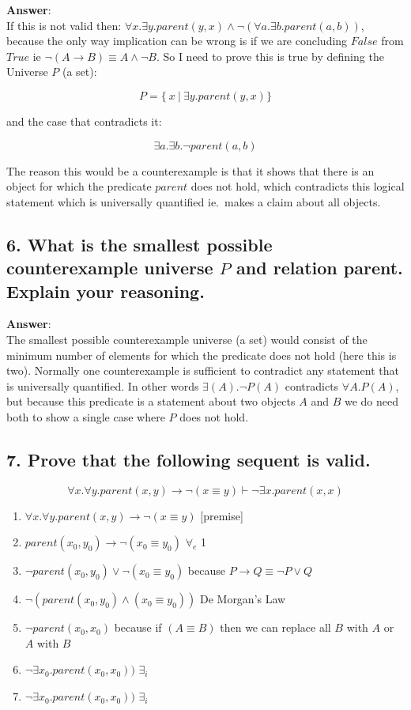 \documentclass[a4paper, 14pt]{report}
\newcommand{\answer}[1]{%
	\begin{flushleft}
		\textbf{Answer}:\\
			#1
	\end{flushleft}}
\newcommand{\question}[1]{\subsection*{#1}}
\begin{document}
\answer{If this is not valid then:
	$ \forall{x}.\exists{y}.parent(y, x) \wedge \neg (\forall{a}.\exists{b}.parent(a, b)) $,
	because the only way implication can be wrong is if we are concluding
	$False$ from $True$ ie $ \neg (A \rightarrow B) \equiv A \wedge \neg B$.
	So I need to prove this is true by defining the Universe $P$ (a set):

	\[ P = \{\ x\ |\ \exists{y}.parent(y, x)\} \]

	and the case that contradicts it:

	\[ \exists{a}.\exists{b}.\neg parent(a, b) \]

	The reason this would be a counterexample is that it shows that
	there is an object for which the predicate $ parent $ does not hold,
	which contradicts this logical statement which is universally
	quantified ie.\ makes a claim about all objects.}

\pagebreak

\question{6. What is the smallest possible counterexample universe $ P $ and relation parent. Explain your reasoning.}

\answer{The smallest possible counterexample universe (a set) would consist
	of the minimum number of elements for which the predicate does not hold (here this is two). 
	Normally one counterexample  is sufficient to contradict any
  statement that is universally quantified. In other words $\exists(A).\neg P(A)$ 
  contradicts $\forall{A}.P(A)$, but because this predicate is a statement
  about two objects $A$ and $B$ we do need both to show a single case where
  $P$ does not hold.}

\question{7. Prove that the following sequent is valid.}

\[ \forall{x}.\forall{y}.parent(x, y) \rightarrow \neg(x \equiv y) \vdash \neg \exists{x}.parent(x, x) \]

\begin{enumerate}		
	\item $ \forall{x}.\forall{y}.parent(x, y) \rightarrow \neg(x \equiv y) $ [premise] \\
	\hline
	\item $ parent(x_0, y_0) \rightarrow \neg (x_0 \equiv y_0)  $ $ \forall_e $ 1
	\item $ \neg parent(x_0, y_0) \vee \neg (x_0 \equiv y_0) $  because $ P \rightarrow Q \equiv \neg P \vee Q $
  \item $ \neg (parent(x_0, y_0) \wedge (x_0 \equiv y_0)) $  De Morgan's Law 
	\item $ \neg parent(x_0, x_0) $  because if $ (A \equiv B ) $ then we can replace all $B$ with $A$ or $A$ with $B$ 
	\item $ \neg \exists{x_0}.parent(x_0, x_0)) $  $ \exists_i $ \\
	\hline
	\item $ \neg \exists{x_0}.parent(x_0, x_0)) $  $ \exists_i $
\end{enumerate}		
\end{document}
